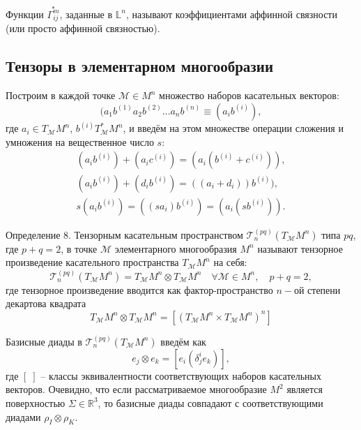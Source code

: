 \documentclass[14pt,a4paper]{scrartcl}
\begin{document}
Функции $\overset{*}{\Gamma_{ij}^m}$, заданные в $\mathbb{L}^n$, называют коэффициентами аффинной связности (или просто аффинной связностью).

\subsection{Тензоры в элементарном многообразии}
Построим в каждой точке $\mathcal{M} \in M^n$ множество наборов касательных векторов:
\begin{equation}\label{eq15}
	(a_1b^{(1)}a_2b^{(2)}\ldots a_nb^{(n)} \equiv (a_ib^{(i)}),
\end{equation}
где $a_i \in T_{\mathcal{M}}M^n$, $b^{(i)} T_{\mathcal{M}}^*M^n$, и введём на этом множестве операции сложения и умножения на вещественное число $s$:
\begin{align}
	(a_ib^{(i)}) + (a_ic^{(i)}) = (a_i(b^{(i)} + c^{(i)})),\label{eq16}\\
	(a_ib^{(i)}) + (d_ib^{(i)}) = ((a_i+d_i)) b^{(i)}),\label{eq17}\\
	s(a_ib^{(i)}) = ((sa_i)b^{(i)}) = (a_i(sb^{(i)})). \label{eq18}
\end{align}

Определение 8. Тензорным касательным пространством $\mathcal{T}_n^{(pq)}(T_{\mathcal{M}}M^n)$ типа $pq$, где $p+q=2$, в точке $\mathcal{M}$ элементарного многообразия $M^n$ называют тензорное произведение касательного пространства $T_{\mathcal{M}}M^n$ на себя:
\begin{equation}\label{eq19}
	\mathcal{T}_{n}^{(p q)}\left(T_{\mathcal{M}} M^{n}\right)=T_{\mathcal{M}} M^{n} \otimes T_{\mathcal{M}} M^{n} \quad \forall \mathcal{M} \in M^{n}, \quad p+q=2,
\end{equation}
где тензорное произведение вводится как фактор-пространство $n-$ой степени декартова квадрата
\begin{equation}\label{eq20}
	T_{\mathcal{M}}M^n \otimes T_{\mathcal{M}}M^n = [(T_{\mathcal{M}}M^n \times T_{\mathcal{M}}M^n)^n]
\end{equation}

Базисные диады в $\mathcal{T}_n^{(pq)}(T_{\mathcal{M}}M^n)$ введём как
\begin{equation}\label{eq21}
	e_j \otimes e_k = [e_i(\delta_j^ie_k)],
\end{equation}
где $[\;]$ -- классы эквивалентности соответствующих наборов касательных векторов. Очевидно, что если рассматриваемое многообразие $M^2$ является поверхностью $\Sigma \in \mathbb{R}^3$, то базисные диады совпадают с соответствующими диадами $\rho_I \otimes \rho_K$.
\end{document}
